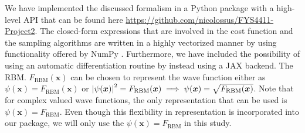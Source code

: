 We have implemented the discussed formalism in a Python package with a high-level API that can be found here \url{https://github.com/nicolossus/FYS4411-Project2}. The closed-form expressions that are involved in the cost function and the sampling algorithms are written in a highly vectorized manner by using functionality offered by NumPy \citep{numpy}. Furthermore, we have included the possibility of using an automatic differentiation routine by instead using a JAX \citep{jax2018github} backend. The RBM. $F_\mathrm{RBM}(\bm{x})$ can be chosen to represent the wave function either as $\psi (\bm{x}) = F_\mathrm{RBM}(\bm{x}) $ or $\abs{\psi (\bm{x})}^2 = F_\mathrm{RBM}(\bm{x}) \implies \psi (\bm{x}) = \sqrt{F_\mathrm{RBM}(\bm{x})}$. Note that for complex valued wave functions, the only representation that can be used is $\psi (\bm{x}) = F_\mathrm{RBM}$. Even though this flexibility in representation is incorporated into our package, we will only use the $\psi (\bm{x}) = F_\mathrm{RBM}$ in this study.



